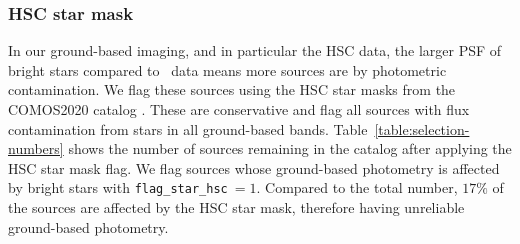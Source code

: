 \documentclass[longauth]{aa}
\begin{document}
\subsubsection{HSC star mask}
In our ground-based imaging, and in particular the HSC data, the larger PSF of bright stars compared to \JWST\ data means more sources are  by photometric contamination. We flag these sources using the HSC star masks \citep{Coupon_HSC_Masks_2018} from the COMOS2020 catalog \citep{weaver_cosmos2020_2022}. These are conservative and flag all sources with flux contamination from stars in all ground-based bands. Table~\ref{table:selection-numbers} shows the number of sources remaining in the catalog after applying the HSC star mask flag. We flag sources whose ground-based photometry is affected by bright stars with \texttt{flag\_star\_hsc}$\ =1$. Compared to the total number, $17\%$ of the sources are affected by the HSC star mask, therefore having unreliable ground-based photometry.
\end{document}
